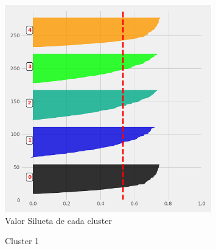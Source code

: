 \begin{figure}[H] 
	\centering
	\includegraphics[width=0.8\textwidth]{Kap4/S}
	\caption{Valor Silueta de cada cluster} 
	\label{fig:S}
\end{figure}

\begin{figure}[H]
	\centering
	\caption{Cluster 1} \label{fig:c1}
\end{figure}

